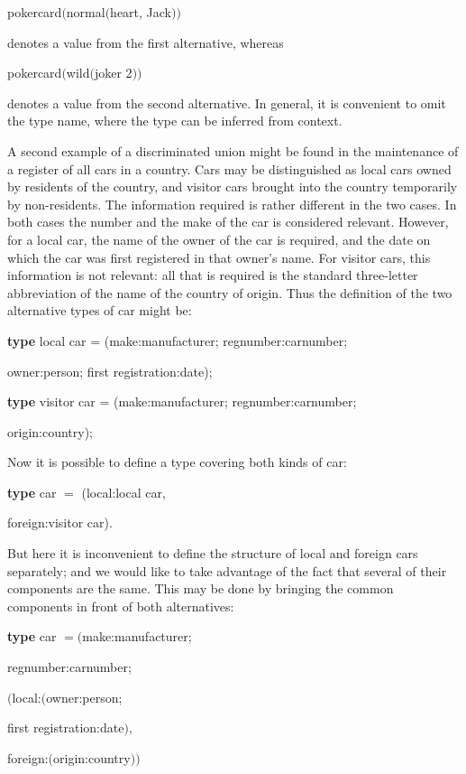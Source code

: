 \quad pokercard$($normal$($heart, Jack$))$

\noindent
denotes a value from the first alternative, whereas

\quad pokercard$($wild$($joker 2$))$

\noindent
denotes a value from the second alternative. In general, it is convenient to omit the type name, where the type can be inferred from context.

A second example of a discriminated union might be found in the maintenance of a register of all cars in a country. Cars may be distinguished as local cars owned by residents of the country, and visitor cars brought into the country temporarily by non-residents. The information required is rather different in the two cases. In both cases the number and the make of the car is considered relevant. However, for a local car, the name of the owner of the car is required, and the date on which the car was first registered in that owner's name. For visitor cars, this information is not relevant: all that is required is the standard three-letter abbreviation of the name of the country of origin. Thus the definition of the two alternative types of car might be:

\quad \textbf{type} local car = (make:manufacturer; regnumber:carnumber;

\tabto{9.4em} owner:person; first registration:date);

\quad \textbf{type} visitor car = (make:manufacturer; regnumber:carnumber;

\tabto{10.1em} origin:country);

Now it is possible to define a type covering both kinds of car:

\quad \textbf{type} car $=$ (local:local car,

\tabto{7.4em} foreign:visitor car).

\noindent
But here it is inconvenient to define the structure of local and foreign cars separately; and we would like to take advantage of the fact that several of their components are the same. This may be done by bringing the common components in front of both alternatives:

\quad \textbf{type} car $= ($make:manufacturer;

\tabto{7.5em}regnumber:carnumber;

\tabto{7.5em}$($local:$($owner:person;

\tabto{7.8em}first registration:date$)$,

\tabto{7.8em}foreign:$($origin:country$))$

